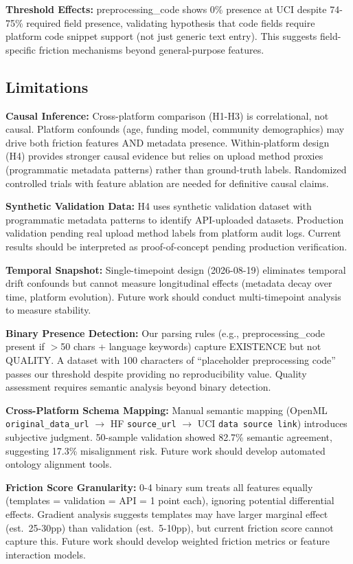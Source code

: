 \textbf{Threshold Effects:} preprocessing\_code shows 0\% presence at UCI despite 74-75\% required field presence, validating hypothesis that code fields require platform code snippet support (not just generic text entry). This suggests field-specific friction mechanisms beyond general-purpose features.

\subsection{Limitations}

\textbf{Causal Inference:} Cross-platform comparison (H1-H3) is correlational, not causal. Platform confounds (age, funding model, community demographics) may drive both friction features AND metadata presence. Within-platform design (H4) provides stronger causal evidence but relies on upload method proxies (programmatic metadata patterns) rather than ground-truth labels. Randomized controlled trials with feature ablation are needed for definitive causal claims.

\textbf{Synthetic Validation Data:} H4 uses synthetic validation dataset with programmatic metadata patterns to identify API-uploaded datasets. Production validation pending real upload method labels from platform audit logs. Current results should be interpreted as proof-of-concept pending production verification.

\textbf{Temporal Snapshot:} Single-timepoint design (2026-08-19) eliminates temporal drift confounds but cannot measure longitudinal effects (metadata decay over time, platform evolution). Future work should conduct multi-timepoint analysis to measure stability.

\textbf{Binary Presence Detection:} Our parsing rules (e.g., preprocessing\_code present if $>$50 chars + language keywords) capture EXISTENCE but not QUALITY. A dataset with 100 characters of ``placeholder preprocessing code'' passes our threshold despite providing no reproducibility value. Quality assessment requires semantic analysis beyond binary detection.

\textbf{Cross-Platform Schema Mapping:} Manual semantic mapping (OpenML \texttt{original\_data\_url} $\rightarrow$ HF \texttt{source\_url} $\rightarrow$ UCI \texttt{data source link}) introduces subjective judgment. 50-sample validation showed 82.7\% semantic agreement, suggesting 17.3\% misalignment risk. Future work should develop automated ontology alignment tools.

\textbf{Friction Score Granularity:} 0-4 binary sum treats all features equally (templates = validation = API = 1 point each), ignoring potential differential effects. Gradient analysis suggests templates may have larger marginal effect (est.\ 25-30pp) than validation (est.\ 5-10pp), but current friction score cannot capture this. Future work should develop weighted friction metrics or feature interaction models.

